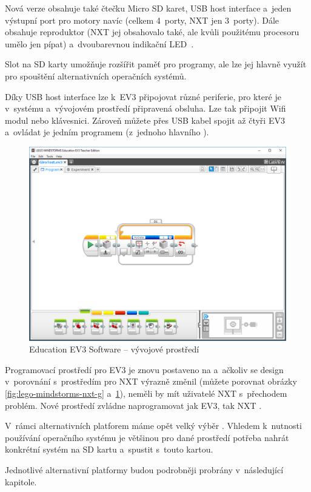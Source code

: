 
Nová verze obsahuje také čtečku Micro SD karet, USB host interface a~jeden výstupní port pro motory navíc (celkem 4~porty, NXT jen 3~porty). Dále obsahuje reproduktor (NXT jej obsahovalo také, ale kvůli použitému procesoru umělo jen pípat) a~dvoubarevnou indikační LED~\cite{legoBotBench_comparing-EV3-and-NXT}. 

Slot na SD karty umožňuje rozšířit paměť pro programy, ale lze jej hlavně využít pro spouštění alternativních operačních systémů. 

Díky USB host interface lze k~EV3 připojovat různé periferie, pro které je v~systému a~vývojovém prostředí připravená obsluha.
Lze tak připojit Wifi modul nebo klávesnici. 
Zároveň můžete přes USB kabel spojit až čtyři EV3  a~ovládat je jedním programem (z~jednoho hlavního ).

\begin{figure}[h]
	\centering
	\includegraphics[width=\textwidth]{images/lego-mindstorms-ev3_dev-soft.png}
	\caption[\legoM{ }Education EV3 Software -- vývojové prostředí]{\legoM{ }Education EV3 Software -- vývojové prostředí}
	\label{fig:lego-mindstorms-ev3_dev-soft}
\end{figure}

Programovací prostředí pro EV3 je znovu postaveno na \labview{ }a~ačkoliv se design v~porovnání s~prostředím pro NXT výrazně změnil (můžete porovnat obrázky \ref{fig:lego-mindstorms-nxt-g} a~\ref{fig:lego-mindstorms-ev3_dev-soft}), neměli by mít uživatelé NXT s~přechodem problém. 
Nové prostředí zvládne naprogramovat jak EV3, tak NXT \brick{}.

V~rámci alternativních platforem máme opět velký výběr \cite{legoMindstormsWikipedia_programming-languages}. 
Vhledem k~nutnosti používání operačního systému je většinou pro dané prostředí potřeba nahrát konkrétní systém na SD kartu a~spustit \brick{ }s~touto kartou.

Jednotlivé alternativní platformy budou podrobněji probrány v~následující kapitole.
